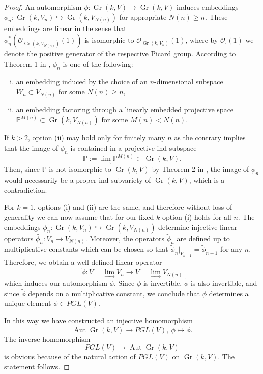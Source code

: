 \documentclass[11pt,twoside]{gsp}
\begin{document}
\begin{proof} An automorphism $\phi: \operatorname{Gr}(k,V)\to \operatorname{Gr}(k,V)$ induces embeddings $\phi_n: \operatorname{Gr}(k,V_n)\hookrightarrow\operatorname{Gr}(k,V_{N(n)})$ for appropriate $N(n)\geq n$. These embeddings are linear in the sense that \\$\phi^*_n( \mathcal O_{\operatorname{Gr}(k,V_{N(n)})}(1))$ is isomorphic to $\mathcal O_{\operatorname{Gr}(k,V_n)}(1)$, where by $\mathcal{O}_{\cdot}(1)$ we denote the positive generator of the respective Picard group. According to Theorem 1 in \cite{PT}, $\phi_n$ is one of the following:


\begin{enumerate}[(i)]
\item an embedding induced by the choice of an $n$-dimensional subspace $W_n\subset V_{N(n)}$ for some $N(n)\geq n$,
\item an embedding factoring through a linearly embedded projective space $\mathbb{P}^{M(n)}\subset  \operatorname{Gr}(k, V_{N(n)})$ for some $M(n)<N(n)$.
\end{enumerate}



If $k>2$, option (ii) may hold only for  finitely many $n$ as the contrary implies that the image of $\phi_n$ is contained in a projective ind-subspace $$\mathbb{P}:=\lim_{\longrightarrow} \mathbb{P}^{M(n)}\subset  \operatorname{Gr}(k,V).$$ Then, since $\mathbb{P}$ is not isomorphic to $ \operatorname{Gr}(k,V)$ by Theorem 2 in \cite{PT}, the image of $\phi_n$ would necessarily be a proper ind-subvariety of $ \operatorname{Gr}(k,V)$, which is a contradiction.

For $k=1$, options (i) and (ii) are the same, and therefore without loss of generality we can now assume that for our fixed $k$ option (i) holds for all $n$. The embeddings $\phi_n: \operatorname{Gr}(k,V_n)\hookrightarrow  \operatorname{Gr}(k,V_{N(n)})$ determine injective linear operators $\tilde{\phi_n}:V_n\to V_{N(n)}$. Moreover, the operators $\tilde \phi_n$ are defined up to multiplicative constants which can be chosen so that $\tilde{\phi}_{n}|_{V_{n-1}}=\tilde{\phi}_{n-1}$ for any $n$. Therefore, we obtain a well-defined linear operator
$$\tilde{\phi}: V=\lim_{\longrightarrow} V_n\to V=\lim_{\longrightarrow}V_{N(n)}$$
which induces our automorphism $\phi$. Since $\phi$ is invertible, $\tilde \phi$ is also invertible, and since $\tilde \phi$ depends on a multiplicative constant, we conclude that $\phi$ determines a unique element $ \bar{\phi}\in PGL(V)$.

In this way we have constructed an injective homomorphism
$$ \operatorname{Aut}\operatorname{Gr}(k,V)\to PGL(V),\: \phi \mapsto \bar\phi.$$
The inverse homomorphism $$ PGL(V)\to \operatorname{Aut}\operatorname{Gr}(k,V)$$ is obvious because of the natural action of $PGL(V)$ on $\operatorname{Gr}(k,V)$. The statement follows.
\end{proof}
\end{document}
